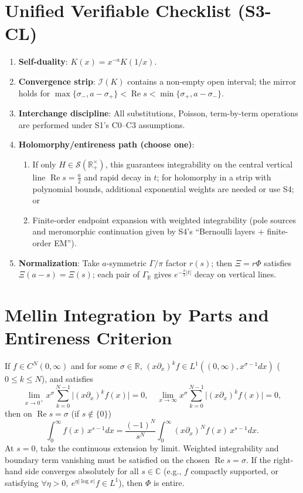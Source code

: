 \documentclass[11pt,a4paper]{article}
\theoremstyle{remark}
\DeclareMathOperator{\Re}{Re}
\begin{document}
\section{Unified Verifiable Checklist (S3-CL)}

\begin{enumerate}
\item \textbf{Self-duality}: $K(x)=x^{-a}K(1/x)$.

\item \textbf{Convergence strip}: $\mathcal{I}(K)$ contains a non-empty open interval; the mirror holds for $\max\{\sigma_-,a-\sigma_+\}<\Re s<\min\{\sigma_+,a-\sigma_-\}$.

\item \textbf{Interchange discipline}: All substitutions, Poisson, term-by-term operations are performed under S1's C0--C3 assumptions.

\item \textbf{Holomorphy/entireness path (choose one)}:
\begin{enumerate}
\item If only $H\in\mathcal{S}(\mathbb{R}_+^\times)$, this guarantees integrability on the central vertical line $\Re s=\frac{a}{2}$ and rapid decay in $t$; for holomorphy in a strip with polynomial bounds, additional exponential weights are needed or use S4; or
\item Finite-order endpoint expansion with weighted integrability (pole sources and meromorphic continuation given by S4's ``Bernoulli layers + finite-order EM'').
\end{enumerate}

\item \textbf{Normalization}: Take $a$-symmetric $\Gamma/\pi$ factor $r(s)$; then $\Xi=r\Phi$ satisfies $\Xi(a-s)=\Xi(s)$; each pair of $\Gamma_{\mathbb{R}}$ gives $e^{-\frac{\pi}{2}|t|}$ decay on vertical lines.
\end{enumerate}

\appendix

\section{Mellin Integration by Parts and Entireness Criterion}

If $f\in C^N(0,\infty)$ and for some $\sigma\in\mathbb{R}$, $(x\partial_x)^k f\in L^1((0,\infty),x^{\sigma-1}dx)$ ($0\le k\le N$), and satisfies
\begin{equation}
\lim_{x\to0^+}x^\sigma\sum_{k=0}^{N-1}\big|(x\partial_x)^k f(x)\big|=0,\quad
\lim_{x\to\infty}x^\sigma\sum_{k=0}^{N-1}\big|(x\partial_x)^k f(x)\big|=0,
\end{equation}
then on $\Re s=\sigma$ (if $s\notin\{0\}$)
\begin{equation}
\int_0^\infty f(x)\,x^{s-1}dx=\frac{(-1)^N}{s^N}\int_0^\infty (x\partial_x)^N f(x)\,x^{s-1}dx.
\end{equation}
At $s=0$, take the continuous extension by limit. Weighted integrability and boundary term vanishing must be satisfied on the chosen $\Re s=\sigma$. If the right-hand side converges absolutely for all $s\in\mathbb{C}$ (e.g., $f$ compactly supported, or satisfying $\forall\eta>0,\ e^{\eta|\log x|}f\in L^1$), then $\Phi$ is entire.
\end{document}

